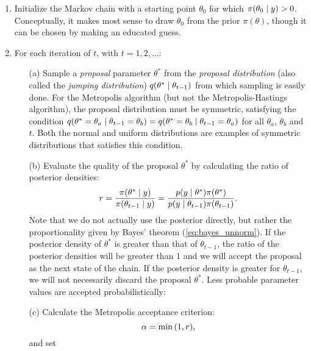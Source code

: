\begin{enumerate}
    \item Initialize the Markov chain with a starting point $\theta_0$ for which $\pi \qty(\theta_0 \mid y)>0$. Conceptually, it makes most sense to draw $\theta_0$ from the prior $\pi(\theta)$, though it can be chosen by making an educated guess. 
    \item For each iteration of $t$, with $t=1, 2, ...$: 
    \begin{itemize}
        \item[(a)] Sample a \textit{proposal} parameter $\theta^*$ from the \textit{proposal distribution} (also called the \textit{jumping distribution}) $q \qty(\theta^* \mid \theta_{t-1})$ from which sampling is easily done. For the Metropolis algorithm (but not the Metropolis-Hastings algorithm), the proposal distribution must be symmetric, satisfying the condition $q \qty(\theta^* = \theta_a \mid \theta_{t-1} = \theta_b) = q \qty(\theta^* = \theta_b \mid \theta_{t-1} = \theta_a)$ for all $\theta_a$, $\theta_b$ and $t$. Both the normal and uniform distributions are examples of symmetric distributions that satisfies this condition. 
        \item[(b)] Evaluate the quality of the proposal $\theta^*$ by calculating the ratio of posterior densities: 
        \begin{equation}\label{eq:metropolis_ratio}
            r = \frac{\pi \qty(\theta^* \mid y)}{\pi \qty(\theta_{t-1} \mid y)} = \frac{p \qty(y \mid \theta^*) \pi \qty(\theta^*)}{p \qty(y \mid \theta_{t-1}) \pi \qty(\theta_{t-1})}.
        \end{equation} 
        Note that we do not actually use the posterior directly, but rather the proportionality given by Bayes' theorem (\autoref{eq:bayes_unnorm}). If the posterior density of $\theta^*$ is greater than that of $\theta_{t-1}$, the ratio of the posterior densities will be greater than 1 and we will accept the proposal as the next state of the chain. If the posterior density is greater for $\theta_{t-1}$, we will not necessarily discard the proposal $\theta^*$. Less probable parameter values are accepted probabilistically:
        \item[(c)] Calculate the Metropolis acceptance criterion:
        \begin{equation}\label{eq:metropolis_acceptance}
            \alpha = \min \qty(1, r),
        \end{equation}
        and set
        \begin{equation*}

\end{equation*}
\end{itemize}
\end{enumerate}
